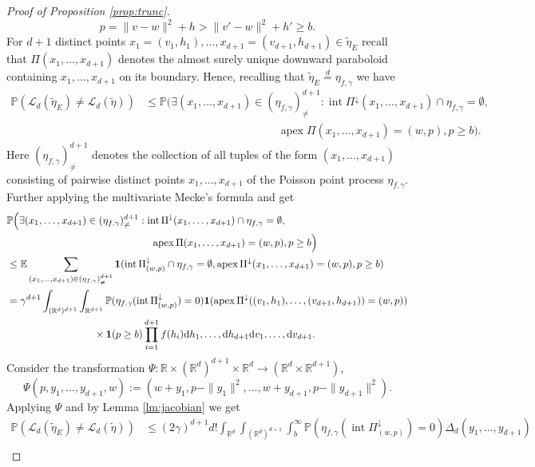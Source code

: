 \documentclass[11pt,a4paper]{article}
\theoremstyle{plain}
\theoremstyle{definition}
\theoremstyle{remark}
\def\EE{\mathbb{E}}
\def\PP{\mathbb{P}}
\def\RR{\mathbb{R}}
\def\cL{\mathcal{L}}
\newcommand{\dd}{{\rm d}}
\newcommand{\inter}{\operatorname{int}}
\newcommand{\apex}{\mathop{\mathrm{apex}}\nolimits}
\begin{document}
\begin{proof}[Proof of Proposition \ref{prop:trunc}]
\[
    p=\|v-w\|^2+h>\|v'-w\|^2+h'\ge b.
\]
For $d+1$ distinct points $x_1=(v_1,h_1),\ldots, x_{d+1}=(v_{d+1},h_{d+1})\in\widetilde\eta_{E}$ recall that $\Pi(x_1,\dots,x_{d+1})$ denotes the almost surely unique downward paraboloid containing $x_1,\dots,x_{d+1}$ on its boundary. Hence, recalling that $\widetilde\eta_{E}\overset{d}{=}\eta_{f,\gamma}$ we have
\begin{align*}
    \PP(\cL_{d}(\widetilde\eta_{E})\neq\cL_{d}(\widetilde\eta))&\le \PP\Big(\exists (x_1,\ldots,x_{d+1})\in (\eta_{f,\gamma})_{\neq}^{d+1}:\inter\Pi^\downarrow(x_1,\ldots,x_{d+1})\cap \eta_{f,\gamma}=\emptyset,\\
    &\hspace{5cm}\apex\Pi(x_1,\ldots,x_{d+1})=(w,p), p\ge b\Big).
\end{align*}
Here $(\eta_{f,\gamma})_{\neq}^{d+1}$ denotes the collection of all tuples of the form $(x_1,\dots,x_{d+1})$ consisting of pairwise distinct points $x_1,\dots,x_{d+1}$  of the Poisson point process $\eta_{f,\gamma}$. Further applying the multivariate Mecke's formula \cite[Corollary 3.2.3]{SW} and get
\begin{align*}
    &\PP\Big(\exists (x_1,\dots,x_{d+1})\in (\eta_{f,\gamma})_{\neq}^{d+1}:\inter\Pi^\downarrow(x_1,\ldots,x_{d+1})\cap \eta_{f,\gamma}=\emptyset,\\
    &\hspace{5cm}\apex\Pi(x_1,\dots,x_{d+1})=(w,p), p\ge b\Big)\\
    &\le \EE\sum_{(x_1,\dots,x_{d+1})\in (\eta_{f,\gamma})_{\neq}^{d+1}} {\bf 1}(\inter\Pi^\downarrow_{(w,p)}\cap\eta_{f,\gamma}=\emptyset, \apex\Pi^\downarrow(x_1,\dots,x_{d+1})=(w,p), p\ge b)\\
    &= \gamma^{d+1}\int_{(\RR^d)^{d+1}}\int_{\RR^{d+1}} \PP(\eta_{f,\gamma}(\inter\Pi^\downarrow_{(w,p)})=0){\bf 1}(\apex\Pi^\downarrow((v_1,h_1),\dots,(v_{d+1},h_{d+1}))=(w,p))\\
    &\hspace{3cm}\times{\bf 1}(p\ge b)\prod_{i=1}^{d+1}f(h_i)\dd h_1,\dots,\dd h_{d+1}\dd v_1,\dots,\dd v_{d+1}.
\end{align*}
 Consider the transformation $\Psi\colon\RR \times (\RR^d)^{d+1} \times \RR^d \to (\RR^d \times \RR^{d+1})$, 
 \[
    \Psi(p,y_1,\dots,y_{d+1}, w):=(w+y_1,p-\|y_1\|^2,\dots,w+y_{d+1},p-\|y_{d+1}\|^2).
 \] 
 Applying $\Psi$ and by Lemma \ref{lm:jacobian} we get
\begin{align*}
    \PP(\cL_{d}(\widetilde\eta_{E})\neq\cL_{d}(\widetilde\eta))&\le(2\gamma)^{d+1}d!\int_{\RR^d}\int_{(\RR^d)^{d+1}}\int_{b}^{\infty} \PP(\eta_{f,\gamma}(\inter\Pi^\downarrow_{(w,p)})=0)\Delta_{d}(y_1,\ldots,y_{d+1})\\

\end{align*}
\end{proof}
\end{document}
